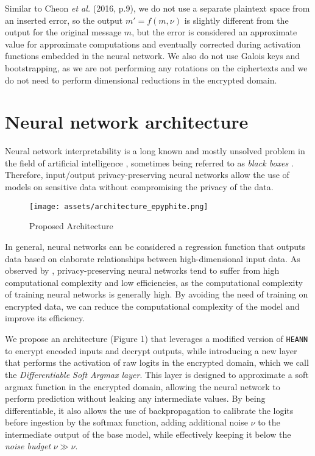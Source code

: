 \documentclass{article}
\begin{document}
Similar to Cheon \emph{et al.} (2016, p.9), we do not use a separate plaintext space from an inserted error, so the output \(m' = f(m, \nu)\) is slightly different from the output for the original message \(m\), but the error is considered an approximate value for approximate computations and eventually corrected during activation functions embedded in the neural network. We also do not use Galois keys and bootstrapping, as we are not performing any rotations on the ciphertexts and we do not need to perform dimensional reductions in the encrypted domain.

\section{Neural network architecture}

Neural network interpretability is a long known and mostly unsolved problem in the field of artificial intelligence \cite{zeiler2014visualizing,karpathy2015visualizing}, sometimes being referred to as \textit{black boxes} \cite{fong2017interpretable}. Therefore, input/output privacy-preserving neural networks allow the use of models on sensitive data without compromising the privacy of the data.

\begin{figure}[h]
    \centering
    \texttt{[image: assets/architecture\_epyphite.png]}
    \caption{Proposed Architecture}
\end{figure}

In general, neural networks can be considered a regression function that outputs data based on elaborate relationships between high-dimensional input data. As observed by \cite{marcolla2022survey}, privacy-preserving neural networks tend to suffer from high computational complexity and low efficiencies, as the computational complexity of training neural networks is generally high. By avoiding the need of training on encrypted data, we can reduce the computational complexity of the model and improve its efficiency.

We propose an architecture (Figure 1) that leverages a modified version of \texttt{HEANN} to encrypt encoded inputs and decrypt outputs, while introducing a new layer that performs the activation of raw logits in the encrypted domain, which we call the \textit{Differentiable Soft Argmax layer}. This layer is designed to approximate a soft argmax function in the encrypted domain, allowing the neural network to perform prediction without leaking any intermediate values. By being differentiable, it also allows the use of backpropagation to calibrate the logits before ingestion by the softmax function, adding additional noise $\nu$ to the intermediate output of the base model, while effectively keeping it below the \emph{noise budget} $\nu \gg \nu$.
\end{document}
